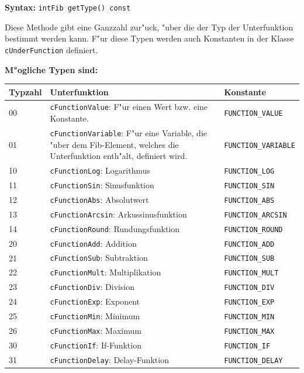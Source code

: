\textbf{Syntax:} \verb|intFib getType() const|

\bigskip\noindent
Diese Methode gibt eine Ganzzahl zur"uck, "uber die der Typ der Unterfunktion bestimmt werden kann. F"ur diese Typen werden auch Konstanten in der Klasse \verb|cUnderFunction| definiert.

\bigskip\noindent
\textbf{M"ogliche Typen sind:}

\noindent
\begin{tabular}{|p{10mm}|p{60mm}|p{40mm}|}\hline
	Typ\-zahl & Unterfunktion & Konstante \\\hline\hline
	00 & \verb|cFunctionValue|: F"ur einen Wert bzw. eine Konstante. & \verb|FUNCTION_VALUE| \\\hline
	01 & \verb|cFunctionVariable|: F"ur eine Variable, die "uber dem Fib-Element, welches die Unterfunktion enth"alt, definiert wird. & \verb|FUNCTION_VARIABLE| \\\hline
	10 & \verb|cFunctionLog|: Logarithmus & \verb|FUNCTION_LOG| \\\hline
	11 & \verb|cFunctionSin|: Sinusfunktion & \verb|FUNCTION_SIN| \\\hline
	12 & \verb|cFunctionAbs|: Absolutwert & \verb|FUNCTION_ABS| \\\hline
	13 & \verb|cFunctionArcsin|: Arkussinusfunktion & \verb|FUNCTION_ARCSIN| \\\hline
	14 & \verb|cFunctionRound|: Rundungsfunktion & \verb|FUNCTION_ROUND| \\\hline
	20 & \verb|cFunctionAdd|: Addition & \verb|FUNCTION_ADD| \\\hline
	21 & \verb|cFunctionSub|: Subtraktion & \verb|FUNCTION_SUB| \\\hline
	22 & \verb|cFunctionMult|: Multiplikation & \verb|FUNCTION_MULT| \\\hline
	23 & \verb|cFunctionDiv|: Division & \verb|FUNCTION_DIV| \\\hline
	24 & \verb|cFunctionExp|: Exponent & \verb|FUNCTION_EXP| \\\hline
	25 & \verb|cFunctionMin|: Minimum & \verb|FUNCTION_MIN| \\\hline
	26 & \verb|cFunctionMax|: Maximum & \verb|FUNCTION_MAX| \\\hline
	30 & \verb|cFunctionIf|: If-Funktion & \verb|FUNCTION_IF| \\\hline
	31 & \verb|cFunctionDelay|: Delay-Funktion & \verb|FUNCTION_DELAY| \\\hline
\end{tabular}


